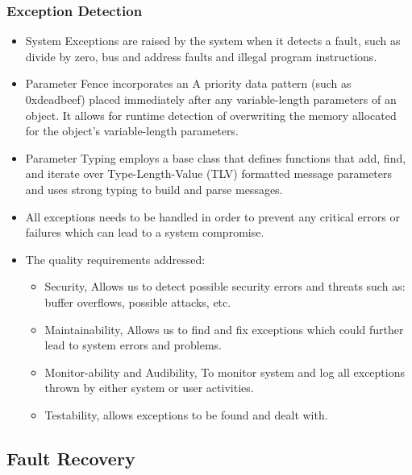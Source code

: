 \documentclass[12pt, oneside]{article}
\begin{document}
		\subsubsection{ Exception Detection }
			\begin{itemize}
			\item System Exceptions are raised by the system when it detects a fault, such as divide by zero, bus and address faults and illegal program instructions.
			
			\item Parameter Fence incorporates an A priority data pattern (such as 0xdeadbeef) placed immediately after any variable-length parameters of an object. It allows for runtime detection of overwriting the memory allocated for the object's variable-length parameters.
			
			\item Parameter Typing employs a base class that defines functions that add, find, and iterate over Type-Length-Value (TLV) formatted message parameters and uses strong typing to build and parse messages.
			
			\item All exceptions needs to be handled in order to prevent any critical errors or failures which can lead to a system compromise.
			
			\item The quality requirements addressed:
			\begin{itemize}
				\item Security, Allows us to detect possible security errors and threats such as: buffer overflows, possible attacks, etc.
				\item Maintainability, Allows us to find and fix exceptions which could further lead to system errors and problems.
				\item Monitor-ability and Audibility, To monitor system and log all exceptions thrown by either system or user activities.
				\item Testability, allows exceptions to be found and dealt with.
			\end{itemize}
		\end{itemize}

	\subsection{Fault Recovery}
		
\end{document}
